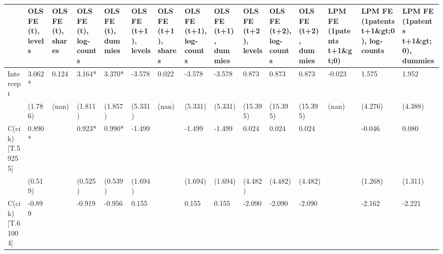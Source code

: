 \begin{table}
\caption{}
\label{}
\begin{center}
\begin{tabular}{lllllllllllllll}
\hline
                  & OLS FE (t), levels & OLS FE (t), shares & OLS FE (t), log-counts & OLS FE (t), dummies & OLS FE (t+1), levels & OLS FE (t+1), shares & OLS FE (t+1), log-counts & OLS FE (t+1), dummies & OLS FE (t+2), levels & OLS FE (t+2), log-counts & OLS FE (t+2), dummies & LPM FE (1{patents t+1\&gt;0}) & LPM FE (1{patents t+1\&gt;0}), log-counts & LPM FE (1{patents t+1\&gt;0}), dummies  \\
\hline
Intercept         & 3.062*             & 0.124              & 3.164*                 & 3.370*              & -3.578               & 0.022                & -3.578                   & -3.578                & 0.873                & 0.873                    & 0.873                 & -0.023                        & 1.575                                     & 1.952                                   \\
                  & (1.786)            & (nan)              & (1.811)                & (1.857)             & (5.331)              & (nan)                & (5.331)                  & (5.331)               & (15.395)             & (15.395)                 & (15.395)              & (nan)                         & (4.276)                                   & (4.388)                                 \\
C(cik)[T.59255]   & 0.890*             &                    & 0.923*                 & 0.990*              & -1.499               &                      & -1.499                   & -1.499                & 0.024                & 0.024                    & 0.024                 &                               & -0.046                                    & 0.080                                   \\
                  & (0.519)            &                    & (0.525)                & (0.539)             & (1.694)              &                      & (1.694)                  & (1.694)               & (4.482)              & (4.482)                  & (4.482)               &                               & (1.268)                                   & (1.311)                                 \\
C(cik)[T.61004]   & -0.899             &                    & -0.919                 & -0.956              & 0.155                &                      & 0.155                    & 0.155                 & -2.090               & -2.090                   & -2.090                &                               & -2.162                                    & -2.221                                  \\

\end{tabular}
\end{center}
\end{table}

